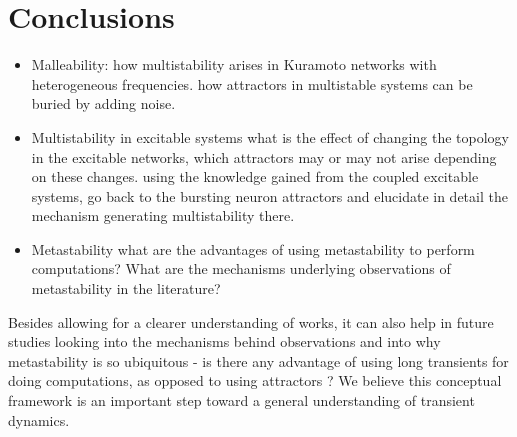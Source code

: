 \chapter{Conclusions}\label{chap:conclusions}

%
\begin{itemize}
    \item Malleability: 
        \subitem how multistability arises in Kuramoto networks with heterogeneous frequencies.
        \subitem how attractors in multistable systems can be buried by adding noise.
    \item Multistability in excitable systems
        \subitem what is the effect of changing the topology in the excitable networks, which attractors may or may not arise depending on these changes.   
        \subitem using the knowledge gained from the coupled excitable systems, go back to the bursting neuron attractors and elucidate in detail the mechanism generating multistability there.
    \item Metastability
        \subitem what are the advantages of using metastability to perform computations? What are the mechanisms underlying observations of metastability in the literature?   
\end{itemize}


Besides allowing for a clearer understanding of works, it can also help in future studies looking into the mechanisms behind observations and into why metastability is so ubiquitous - is there any advantage of using long transients for doing computations, as opposed to using attractors \cite{koch2024XX}?  
We believe this conceptual framework is an important step toward a general understanding of transient dynamics. 